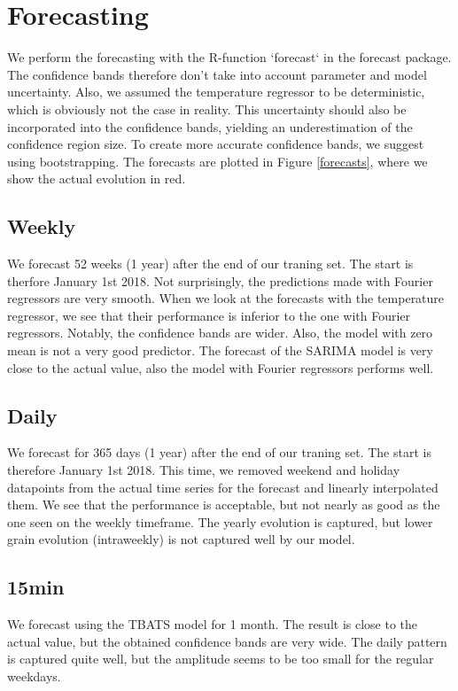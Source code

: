 \documentclass[conference]{IEEEtran}
\begin{document}
\section{Forecasting}
We perform the forecasting with the R-function `forecast` in the forecast package. The confidence bands therefore don't take into account parameter and model uncertainty. Also, we assumed the temperature regressor to be deterministic, which is obviously not the case in reality. This uncertainty should also be incorporated into the confidence bands, yielding an underestimation of the confidence region size. To create more accurate confidence bands, we suggest using bootstrapping. The forecasts are plotted in Figure \ref{forecasts}, where we show the actual evolution in red.
\subsection{Weekly}
We forecast 52 weeks (1 year) after the end of our traning set. The start is therfore January 1st 2018. 
Not surprisingly, the predictions made with Fourier regressors are very smooth. When we look at the forecasts with the temperature regressor, we see that their performance is inferior to the one with Fourier regressors. Notably, the confidence bands are wider. Also, the model with zero mean is not a very good predictor. 
The forecast of the SARIMA model is very close to the actual value, also the model with Fourier regressors performs well.
\subsection{Daily}
We forecast for 365 days (1 year) after the end of our traning set. The start is therefore January 1st 2018. 
This time, we removed weekend and holiday datapoints from the actual time series for the forecast and linearly interpolated them.
We see that the performance is acceptable, but not nearly as good as the one seen on the weekly timeframe.
The yearly evolution is captured, but lower grain evolution (intraweekly) is not captured well by our model.
\subsection{15min}
We forecast using the TBATS model for 1 month. The result is close to the actual value, but the obtained confidence bands are very wide. The daily pattern is captured quite well, but the amplitude seems to be too small for the regular weekdays.
\end{document}
